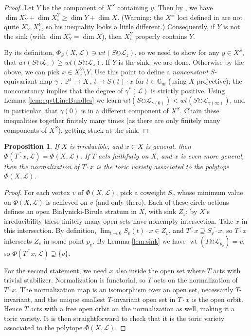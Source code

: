 \documentclass[10pt,a4paper]{amsart}
\newtheorem{proposition}[Thm]{Proposition}
\DeclareMathOperator{\wt}{wt}
\newcommand{\PP}{\mathbb{P}}
\newcommand\calL{{\mathcal L}}
\newcommand\Gm{{\mathbb G}_m}
\newcommand\actson\circlearrowright
\renewcommand{\colon}{\mathrel{:}}
\renewcommand{\colon}{:\mkern\thinmuskip}
\begin{document}
\begin{proof}
  Let $Y$ be the component of $X^S$ containing $y$. Then by \cite{Konarski},
  we have $\dim X_Y^\circ + \dim X^Y_\circ \geq \dim Y + \dim X$.
  (Warning: the $X^\pm$ loci defined in \cite{Konarski} are not quite
  $X_Y^\circ,X^Y_\circ$, so his inequality looks a little different.)
  Consequently, if $Y$ is not the sink (with $\dim X_Y^\circ = \dim X$),
  then $X^Y_\circ$ properly contains $Y$.

  By its definition, $\Phi_S(X,\calL) \ni wt(S\actson \calL_z)$,
  so we need to show for any $y\in X^S$,
  that $wt(S\actson \calL_x) \geq wt(S\actson \calL_z)$.
  If $Y$ is the sink, we are done. Otherwise by the above,
  we can pick $x \in X^Y_\circ \setminus Y$. Use this point to define a
  {\em nonconstant} $S$-equivariant map
  $\gamma\colon \PP^1 \to X$, $t \mapsto S(t)\cdot x$
  for $t\in\Gm$ (using $X$ projective); the nonconstancy implies that
  the degree of $\gamma^*(\calL)$ is strictly positive.
  Using Lemma \ref{lem:eqvtLineBundles}
  we learn $wt(S\actson \calL_{\gamma(0)}) < wt(S\actson \calL_{\gamma(\infty)})$,
  and in particular, that $\gamma(0)$ is in a different component of $X^S$.
  Chain these inequalities together finitely many times (as there are
  only finitely many components of $X^S$), getting stuck at the sink.
\end{proof}

\begin{proposition}\label{prop:TorbitClosure}
  If $X$ is irreducible, and $x\in X$ is general, then
  $\Phi\left(\overline{T\cdot x}, \calL\right) = \Phi(X, \calL)$.
  If $T$ acts faithfully on $X$, and $x$ is even more general,
  then the normalization of $\overline{T\cdot x}$ is the
  toric variety associated to the polytope $\Phi(X, \calL)$.
\end{proposition}

\begin{proof}
  For each vertex $v$ of $\Phi(X, \calL)$, pick a coweight $S_v$
  whose minimum value on $\Phi(X, \calL)$ is achieved on $v$ (and only there).
  Each of these circle actions defines an open Bia\l ynicki-Birula
  stratum in $X$, with sink $Z_v$; by $X$'s irreducibility these
  finitely many open sets have nonempty intersection. Take $x$ in this
  intersection. By definition, $\lim_{t\to 0} S_v(t)\cdot x \in Z_v$, and
  $\overline{T\cdot x} \supseteq \overline{S_v\cdot x}$,
  so $\overline{T\cdot x}$ intersects $Z_v$ in some point $p_v$.
  By Lemma \ref{lem:sink} we have $\wt(T\actson \calL_{p_v}) = v$,
  so $\Phi\left(\overline{T\cdot x},\calL\right) \supseteq \{v\}$.

  For the second statement, we need $x$ also inside the open set where
  $T$ acts with trivial stabilizer. Normalization is functorial,
  so $T$ acts on the normalization of $\overline{T \cdot x}$.
  The normalization map
  is an isomorphism over an open set, necessarily $T$-invariant,
  and the unique smallest $T$-invariant open set in $\overline{T\cdot x}$
  is the open orbit. Hence $T$ acts with a free open orbit on the
  normalization as well, making it a toric variety. It is then
  straightforward to check that it is the toric variety associated
  to the polytope $\Phi(X,\calL)$.
\end{proof}
\end{document}
